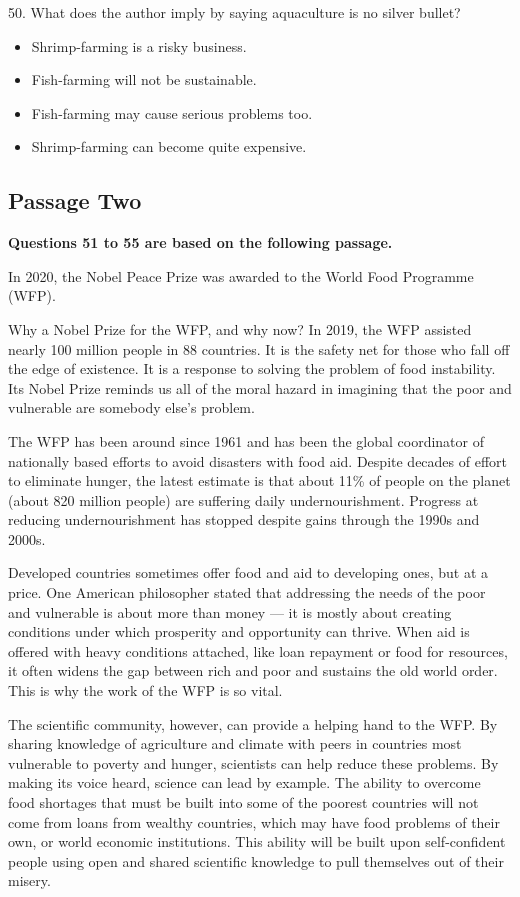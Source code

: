 \documentclass[UTF8,11pt]{ctexart}
\begin{document}
50. What does the author imply by saying aquaculture is no silver bullet?


\begin{itemize}[leftmargin=2em,itemsep=.2em,topsep=.4em]\item[A.] Shrimp-farming is a risky business.
\item[B.] Fish-farming will not be sustainable.
\item[C.] Fish-farming may cause serious problems too.
\item[D.] Shrimp-farming can become quite expensive.
\end{itemize}

\subsection*{\textbf{Passage Two}}


\textbf{Questions 51 to 55 are based on the following passage.}


In 2020, the Nobel Peace Prize was awarded to the World Food Programme (WFP).


Why a Nobel Prize for the WFP, and why now? In 2019, the WFP assisted nearly 100 million people in 88 countries. It is the safety net for those who fall off the edge of existence. It is a response to solving the problem of food instability. Its Nobel Prize reminds us all of the moral hazard in imagining that the poor and vulnerable are somebody else's problem.


The WFP has been around since 1961 and has been the global coordinator of nationally based efforts to avoid disasters with food aid. Despite decades of effort to eliminate hunger, the latest estimate is that about 11\% of people on the planet (about 820 million people) are suffering daily undernourishment. Progress at reducing undernourishment has stopped despite gains through the 1990s and 2000s.


Developed countries sometimes offer food and aid to developing ones, but at a price. One American philosopher stated that addressing the needs of the poor and vulnerable is about more than money — it is mostly about creating conditions under which prosperity and opportunity can thrive. When aid is offered with heavy conditions attached, like loan repayment or food for resources, it often widens the gap between rich and poor and sustains the old world order. This is why the work of the WFP is so vital.


The scientific community, however, can provide a helping hand to the WFP. By sharing knowledge of agriculture and climate with peers in countries most vulnerable to poverty and hunger, scientists can help reduce these problems. By making its voice heard, science can lead by example. The ability to overcome food shortages that must be built into some of the poorest countries will not come from loans from wealthy countries, which may have food problems of their own, or world economic institutions. This ability will be built upon self-confident people using open and shared scientific knowledge to pull themselves out of their misery.
\end{document}
